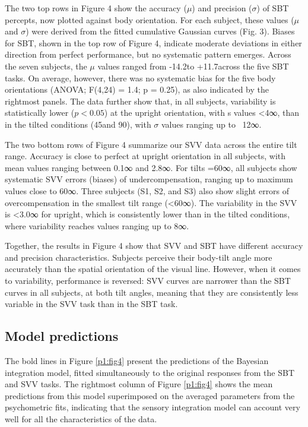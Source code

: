 The two top rows in Figure 4 show the accuracy ($\mu$) and precision ($\sigma$) of SBT percepts, now plotted against body orientation. For each subject, these values ($\mu$ and $\sigma$) were derived from the fitted cumulative Gaussian curves (Fig. 3). Biases for SBT, shown in the top row of Figure 4, indicate moderate deviations in either direction from perfect performance, but no systematic pattern emerges. Across the seven subjects, the $\mu$ values ranged from -14.2\textdegree to +11.7\textdegree across the five SBT tasks. On average, however, there was no systematic bias for the five body orientations (ANOVA; F(4,24) = 1.4; p = 0.25), as also indicated by the rightmost panels. The data further show that, in all subjects, variability is statistically lower ($p < 0.05$) at the upright orientation, with s values <4∞, than in the tilted conditions (45\textdegree and 90\textdegree), with $\sigma$ values ranging up to ~12∞. 

The two bottom rows of Figure 4 summarize our SVV data across the entire tilt range. Accuracy is close to perfect at upright orientation in all subjects, with mean values ranging between 0.1∞ and 2.8∞. For tilts =60∞, all subjects show systematic SVV errors (biases) of undercompensation, ranging up to maximum values close to 60∞. Three subjects (S1, S2, and S3) also show slight errors of overcompensation in the smallest tilt range (<60∞). The variability in the SVV is <3.0∞ for upright, which is consistently lower than in the tilted conditions, where variability reaches values ranging up to 8∞. 

Together, the results in Figure 4 show that SVV and SBT have different accuracy and precision characteristics. Subjects perceive their body-tilt angle more accurately than the spatial orientation of the visual line. However, when it comes to variability, performance is reversed: SVV curves are narrower than the SBT curves in all subjects, at both tilt angles, meaning that they are consistently less variable in the SVV task than in the SBT task. 

\subsection{Model predictions}

The bold lines in Figure \ref{p1:fig4} present the predictions of the Bayesian integration model, fitted simultaneously to the original responses from the SBT and SVV tasks. The rightmost column of Figure \ref{p1:fig4} shows the mean predictions from this model superimposed on the averaged parameters from the psychometric fits, indicating that the sensory integration model can account very well for all the characteristics of the data. 

